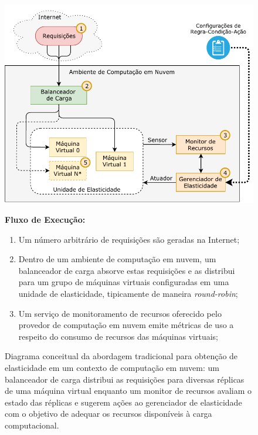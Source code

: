 \documentclass[english,brazilian]{UNISINOSmonografia} %
\begin{document}
\begin{figure}[tbp]
	\centering%
	\begin{minipage}{\textwidth}
		\caption{Diagrama conceitual da abordagem tradicional para obtenção de elasticidade em um contexto de computação em nuvem: um balanceador de carga distribui as requisições para diversas réplicas de uma máquina virtual enquanto um monitor de recursos avaliam o estado das réplicas e sugerem ações ao gerenciador de elasticidade com o objetivo de adequar os recursos disponíveis à carga computacional.}
		\label{fig:modelo-lb}
		\includegraphics[width=\textwidth]{modelo-lb}
		\centering
		\begin{minipage}{.8\textwidth}
			\centering
			\small
			\vspace{1ex}
			\textbf{Fluxo de Execução:}
			\begin{enumerate}[leftmargin=*]
				\item Um número arbitrário de requisições são geradas na Internet;
				\item Dentro de um ambiente de computação em nuvem, um balanceador de carga absorve estas requisições e as distribui para um grupo de máquinas virtuais configuradas em uma unidade de elasticidade, tipicamente de maneira \textit{round-robin};
				\item Um serviço de monitoramento de recursos oferecido pelo provedor de computação em nuvem emite métricas de uso a respeito do consumo de recursos das máquinas virtuais;

\end{enumerate}
\end{minipage}
\end{minipage}
\end{figure}
\end{document}
